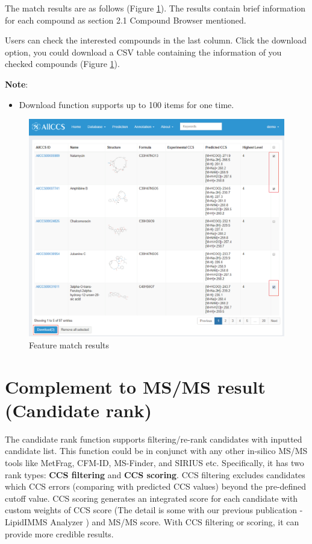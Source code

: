 \documentclass[12pt,]{book}
\providecommand{\tightlist}{%
  \setlength{\itemsep}{0pt}\setlength{\parskip}{0pt}}
\theoremstyle{definition}
\theoremstyle{definition}
\theoremstyle{definition}
\theoremstyle{remark}
\begin{document}
The match results are as follows (Figure \ref{fig:figure4d2}). The
results contain brief information for each compound as section 2.1
Compound Browser mentioned.

Users can check the interested compounds in the last column. Click the
download option, you could download a CSV table containing the
information of you checked compounds (Figure \ref{fig:figure4d2}).

\textbf{Note}:

\begin{itemize}
\tightlist
\item
  Download function supports up to 100 items for one time.
\end{itemize}

\begin{figure}

{\centering \includegraphics{images/chapter4/figure4.2feature_match} 

}

\caption{Feature match results}\label{fig:figure4d2}
\end{figure}

\section{Complement to MS/MS result (Candidate rank)}\label{chapter4d2}

The candidate rank function supports filtering/re-rank candidates with
inputted candidate list. This function could be in conjunct with any
other in-silico MS/MS tools like MetFrag, CFM-ID, MS-Finder, and SIRIUS
etc. Specifically, it has two rank types: \textbf{CCS filtering} and
\textbf{CCS scoring}. CCS filtering excludes candidates which CCS errors
(comparing with predicted CCS values) beyond the pre-defined cutoff
value. CCS scoring generates an integrated score for each candidate with
custom weights of CCS score (The detail is some with our previous
publication - LipidIMMS Analyzer \citep{reference9}) and MS/MS score.
With CCS filtering or scoring, it can provide more credible results.
\end{document}
